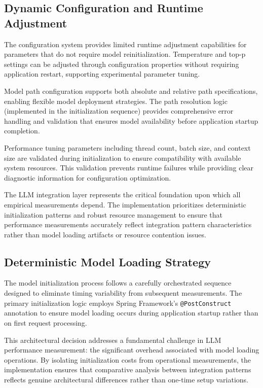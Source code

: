 \subsection{Dynamic Configuration and Runtime Adjustment}

The configuration system provides limited runtime adjustment capabilities for parameters that do not require model reinitialization. Temperature and top-p settings can be adjusted through configuration properties without requiring application restart, supporting experimental parameter tuning.

Model path configuration supports both absolute and relative path specifications, enabling flexible model deployment strategies. The path resolution logic (implemented in the initialization sequence) provides comprehensive error handling and validation that ensures model availability before application startup completion.

Performance tuning parameters including thread count, batch size, and context size are validated during initialization to ensure compatibility with available system resources. This validation prevents runtime failures while providing clear diagnostic information for configuration optimization.

The LLM integration layer represents the critical foundation upon which all empirical measurements depend. The implementation prioritizes deterministic initialization patterns and robust resource management to ensure that performance measurements accurately reflect integration pattern characteristics rather than model loading artifacts or resource contention issues.

\subsection{Deterministic Model Loading Strategy}

The model initialization process follows a carefully orchestrated sequence designed to eliminate timing variability from subsequent measurements. The primary initialization logic employs Spring Framework's \texttt{@PostConstruct} annotation to ensure model loading occurs during application startup rather than on first request processing.


This architectural decision addresses a fundamental challenge in LLM performance measurement: the significant overhead associated with model loading operations. By isolating initialization costs from operational measurements, the implementation ensures that comparative analysis between integration patterns reflects genuine architectural differences rather than one-time setup variations.

